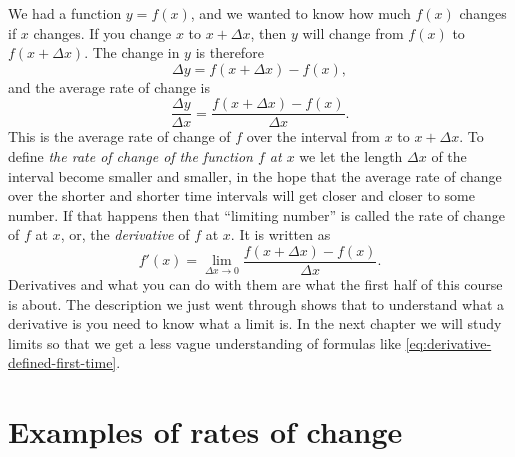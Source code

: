 We had a function $y=f(x)$, and we wanted to know how much $f(x)$ changes if $x$
changes.  If you change $x$ to $x+\Delta x$, then $y$ will change from $f(x)$ to
$f(x+\Delta x)$.  The change in $y$ is therefore
\[
\Delta y = f(x+\Delta x) - f(x),
\]
and the average rate of change is
\begin{equation} \label{eq:difference-quotient} \frac{\Delta y}{\Delta x} =
  \frac{f(x+\Delta x) - f(x)}{\Delta x}.
\end{equation}
This is the average rate of change of $f$ over the interval from $x$ to
$x+\Delta x$.  To define \emph{the rate of change of the function $f$ at $x$} we
let the length $\Delta x$ of the interval become smaller and smaller, in the
hope that the average rate of change over the shorter and shorter time intervals
will get closer and closer to some number.  If that happens then that ``limiting
number'' is called the rate of change of $f$ at $x$, or, the \emph{derivative}
of $f$ at $x$.  It is written as
\begin{equation}
  \label{eq:derivative-defined-first-time}
  f'(x) = \lim_{\Delta x\to 0}\frac{f(x+\Delta x) - f(x)}{\Delta x}.
\end{equation}
Derivatives and what you can do with them are what the first half of this course
is about.  The description we just went through shows that to understand what a
derivative is you need to know what a limit is.  In the next chapter we will
study limits so that we get a less vague understanding of formulas like
\eqref{eq:derivative-defined-first-time}.

\section{Examples of rates of change}

